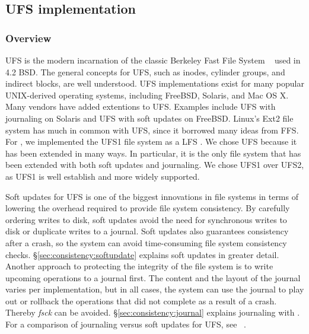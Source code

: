 \subsection{UFS implementation}
\label{sec:modules:ufs}

\subsubsection {Overview}
UFS is the modern incarnation of the classic Berkeley Fast File System
~\cite{mckusick84fast} used in 4.2 BSD. The general concepts for UFS, such as
inodes, cylinder groups, and indirect blocks, are well understood. UFS
implementations exist for many popular UNIX-derived operating systems,
including FreeBSD, Solaris, and Mac OS X. Many vendors have added extentions
to UFS. Examples include UFS with journaling on Solaris and UFS with soft
updates on FreeBSD. Linux's Ext2 file system has much in common with UFS,
since it borrowed many ideas from FFS. For \Kudos, we implemented the UFS1
file system as a LFS \module. We chose UFS because it has been extended in
many ways. In particular, it is the only file system that has been extended
with both soft updates and journaling. We chose UFS1 over UFS2, as UFS1 is
well establish and more widely supported.

Soft updates for UFS is one of the biggest innovations in file systems
in terms of lowering the overhead required to provide file system
consistency.  By carefully ordering writes to disk, soft updates avoid
the need for synchronous writes to disk or duplicate writes to a
journal. Soft updates also guarantees consistency after a crash, so
the system can avoid time-consuming file system consistency
checks. \S\ref{sec:consistency:softupdate} explains soft updates in
greater detail.  Another approach to protecting the integrity of the
file system is to write upcoming operations to a journal first. The
content and the layout of the journal varies per implementation, but
in all cases, the system can use the journal to play out or rollback
the operations that did not complete as a result of a crash. Thereby
\emph{fsck} can be avoided. \S\ref{sec:consistency:journal} explains
journaling with \chdescs.  For a comparison of journaling versus soft
updates for UFS, see ~\cite{seltzer00journaling}.

